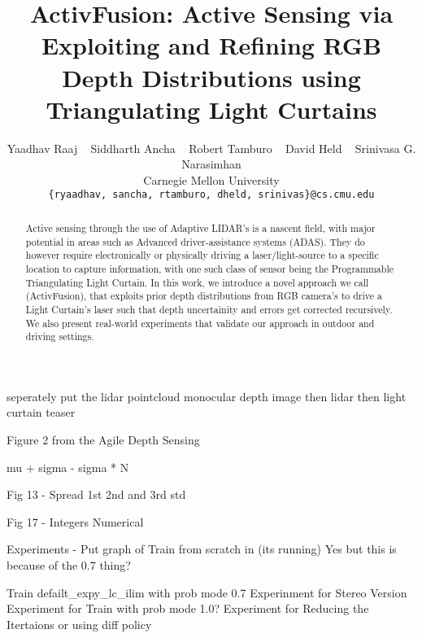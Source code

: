 \documentclass[review]{cvpr}
\begin{document}
\title{ActivFusion: Active Sensing via Exploiting and Refining RGB Depth Distributions using Triangulating Light Curtains}

\author{Yaadhav Raaj ~ Siddharth Ancha ~ Robert Tamburo ~ David Held ~ Srinivasa G. Narasimhan\\
Carnegie Mellon University\\
{\tt\small \{ryaadhav, sancha, rtamburo, dheld, srinivas\}@cs.cmu.edu}
}

\maketitle

\begin{abstract}
Active sensing through the use of Adaptive LIDAR's is a nascent field, with major potential in areas such as Advanced driver-assistance systems (ADAS). They do however require electronically or physically driving a laser/light-source to a specific location to capture information, with one such class of sensor being the Programmable Triangulating Light Curtain. In this work, we introduce a novel approach we call (ActivFusion), that exploits prior depth distributions from RGB camera's to drive a Light Curtain's laser such that depth uncertainity and errors get corrected recursively. We also present real-world experiments that validate our approach in outdoor and driving settings.
\end{abstract}

\iffalse
seperately put the lidar pointcloud
monocular depth image
then lidar
then light curtain
teaser

Figure 2 from the Agile Depth Sensing   

mu + sigma - sigma * N

Fig 13 - Spread 1st 2nd and 3rd std

Fig 17 - Integers Numerical

Experiments - Put graph of Train from scratch in (its running)
Yes but this is because of the 0.7 thing?

Train defailt_expy_lc_ilim with prob mode 0.7
Experinment for Stereo Version
Experiment for Train with prob mode 1.0?
Experiment for Reducing the Itertaions or using diff policy
\end{document}
